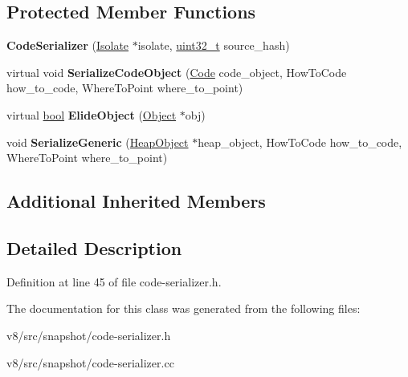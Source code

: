 \subsection*{Protected Member Functions}
\begin{DoxyCompactItemize}
\item 
\mbox{\label{classv8_1_1internal_1_1CodeSerializer_a44c67d0d7900cb724f13c7ec3c36a13a}} 
{\bfseries Code\+Serializer} (\mbox{\hyperlink{classv8_1_1internal_1_1Isolate}{Isolate}} $\ast$isolate, \mbox{\hyperlink{classuint32__t}{uint32\+\_\+t}} source\+\_\+hash)
\item 
\mbox{\label{classv8_1_1internal_1_1CodeSerializer_a73ef483e536bee4052653b9c5d21b3a2}} 
virtual void {\bfseries Serialize\+Code\+Object} (\mbox{\hyperlink{classv8_1_1internal_1_1Code}{Code}} code\+\_\+object, How\+To\+Code how\+\_\+to\+\_\+code, Where\+To\+Point where\+\_\+to\+\_\+point)
\item 
\mbox{\label{classv8_1_1internal_1_1CodeSerializer_a19ae56f19f676ed64563bc4b0ba89951}} 
virtual \mbox{\hyperlink{classbool}{bool}} {\bfseries Elide\+Object} (\mbox{\hyperlink{classv8_1_1internal_1_1Object}{Object}} $\ast$obj)
\item 
\mbox{\label{classv8_1_1internal_1_1CodeSerializer_a3d70ea8cd3a78014ded230ab81153637}} 
void {\bfseries Serialize\+Generic} (\mbox{\hyperlink{classv8_1_1internal_1_1HeapObject}{Heap\+Object}} $\ast$heap\+\_\+object, How\+To\+Code how\+\_\+to\+\_\+code, Where\+To\+Point where\+\_\+to\+\_\+point)
\end{DoxyCompactItemize}
\subsection*{Additional Inherited Members}


\subsection{Detailed Description}


Definition at line 45 of file code-\/serializer.\+h.



The documentation for this class was generated from the following files\+:\begin{DoxyCompactItemize}
\item 
v8/src/snapshot/code-\/serializer.\+h\item 
v8/src/snapshot/code-\/serializer.\+cc\end{DoxyCompactItemize}
